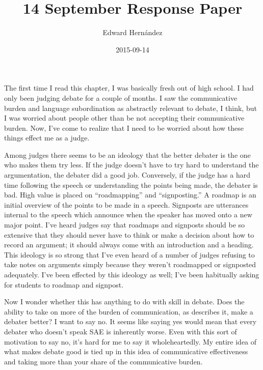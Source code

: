 \documentclass[man,12pt]{apa6}
\begin{document}
\title{14 September Response Paper}
\author{Edward Hern\'{a}ndez}
\date{2015-09-14}
\maketitle

The first time I read this chapter, I was basically fresh out of high school. I
had only been judging debate for a couple of months. I saw the communicative
burden and language subordination as abstractly relevant to debate, I think,
but I was worried about people other than be not accepting their communicative
burden. Now, I've come to realize that I need to be worried about how these
things effect me as a judge. 

Among judges there seems to be an ideology that the better debater is the one
who makes them try less. If the judge doesn't have to try hard to understand
the argumentation, the debater did a good job. Conversely, if the judge has a
hard time following the speech or understanding the points being made, the
debater is bad. High value is placed on “roadmapping” and “signposting.” A
roadmap is an initial overview of the points to be made in a speech. Signposts
are utterances internal to the speech which announce when the speaker has moved
onto a new major point. I've heard judges say that roadmaps and signposts
should be so extensive that they should never have to think or make a decision
about how to record an argument; it should always come with an introduction and
a heading. This ideology is so strong that I've even heard of a number of
judges refusing to take notes on arguments simply because they weren't
roadmapped or signposted adequately. I've been effected by this ideology as
well; I've been habitually asking for students to roadmap and signpost. 

Now I wonder whether this has anything to do with skill in debate.  Does the
ability to take on more of the burden of communication, as
\citet{Lippi-Green11} describes it, make a debater better? 
I want to say no. It seems like saying yes would mean that every debater who
doesn't speak SAE is inherently worse. Even with this sort of motivation to say
no, it's hard for me to say it wholeheartedly. My entire idea of what makes
debate good is tied up in this idea of communicative effectiveness and taking
more than your share of the communicative burden.
\end{document}
